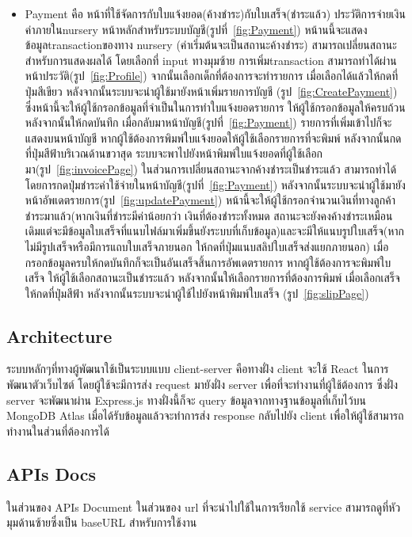 \begin{itemize}
  \item  Payment คือ หน้าที่ใช้จัดการกับใบแจ้งยอด(ค้างชำระ)กับใบเสร็จ(ชำระแล้ว) ประวัติการจ่ายเงินค่าภายในnursery หน้าหลักสำหรับระบบบัญชี(รูปที่~\ref{fig:Payment}) หน้านนี้จะแสดงข้อมูลtransactionของทาง nursery (ค่าเริ่มต้นจะเป็นสถานะค้างชำระ) สามารถเปลี่ยนสถานะสำหรับการแสดงผลได้ โดยเลือกที่ input ทางมุมซ้าย 
  การเพิ่มtransaction สามารถทำได้ผ่านหน้าประวัติ(รูป~\ref{fig:Profile}) จากนั้นเลือกเด็กที่ต้องการจะทำรายการ เมื่อเลือกได้แล้วให้กดที่ปุ่มสีเขียว
  หลังจากนั้นระบบจะนำผู้ใช้มายังหน้าเพิ่มรายการบัญชี (รูป~\ref{fig:CreatePayment}) ซึ่งหน้านี้จะให้ผู้ใช้กรอกข้อมูลที่จำเป็นในการทำใบแจ้งยอดรายการ ให้ผู้ใช้กรอกข้อมูลให้ครบถ้วน หลังจากนั้นให้กดบันทึก
  เมื่อกลับมาหน้าบัญชี(รูปที่~\ref{fig:Payment}) รายการที่เพิ่มเข้าไปก็จะแสดงบนหน้าบัญชี หากผู้ใช้ต้องการพิมพ์ใบแจ้งยอดให้ผู้ใช้เลือกรายการที่จะพิมพ์ หลังจากนั้นกดที่ปุ่มสีฟ้าบริเวณด้านขวาสุด
  ระบบจะพาไปยังหน้าพิมพ์ใบแจ้งยอดที่ผู้ใช้เลือกมา(รูป~\ref{fig:invoicePage}) 
  ในส่วนการเปลี่ยนสถานะจากค้างชำระเป็นชำระแล้ว สามารถทำได้โดยการกดปุ่มชำระค่าใช้จ่ายในหน้าบัญชี(รูปที่~\ref{fig:Payment}) หลังจากนั้นระบบจะนำผู้ใช้มายังหน้าอัพเดตรายการ(รูป~\ref{fig:updatePayment})
  หน้านี้จะให้ผู้ใช้กรอกจำนวนเงินที่ทางลูกค้าชำระมาแล้ว(หากเงินที่ชำระมีค่าน้อยกว่า เงินที่ต้องชำระทั้งหมด สถานะจะยังคงค้างชำระเหมือนเดิมแต่จะมีข้อมูลใบเสร็จที่แนบไฟล์มาเพิ่มขึ้นยังระบบที่เก็บข้อมูล)และจะมีให้แนบรูปใบเสร็จ(หากไม่มีรูปเสร็จหรือมีการแถบใบเสร็จภายนอก ให้กดที่ปุ่มแนบสลิปใบเสร็จส่งแยกภายนอก)
  เมื่อกรอกข้อมูลครบให้กดบันทึกก็จะเป็นอันเสร็จสิ้นการอัพเดตรายการ หากผู้ใช้ต้องการจะพิมพ์ใบเสร็จ
  ให้ผู้ใช้เลือกสถานะเป็นชำระแล้ว หลังจากนั้นให้เลือกรายการที่ต้องการพิมพ์ เมื่อเลือกเสร็จให้กดที่ปุ่มสีฟ้า
  หลังจากนั้นระบบจะนำผู้ใช้ไปยังหน้าพิมพ์ใบเสร็จ (รูป~\ref{fig:slipPage}) 

\end{itemize}

\subsection{Architecture}

ระบบหลักๆที่ทางผู้พัฒนาใช้เป็นระบบแบบ client-server คือทางฝั่ง client จะใช้ React ในการพัฒนาตัวเว็บไซต์ โดยผู้ใช้จะมีการส่ง request มายังฝั่ง server เพื่อที่จะทำงานที่ผู้ใช้ต้องการ ซึ่งฝั่ง server 
จะพัฒนาผ่าน Express.js ทางฝั่งนี้ก็จะ query ข้อมูลจากทางฐานข้อมูลที่เก็บไว้บน MongoDB Atlas เมื่อได้รับข้อมูลแล้วจะทำการส่ง response กลับไปยัง client เพื่อให้ผู้ใช้สามารถทำงานในส่วนที่ต้องการได้

\subsection{APIs Docs}
ในส่วนของ APIs Document ในส่วนของ url ที่จะนำไปใช้ในการเรียกใช้ service สามารถดูที่หัวมุมด้านซ้ายซึ่งเป็น baseURL สำหรับการใช้งาน

